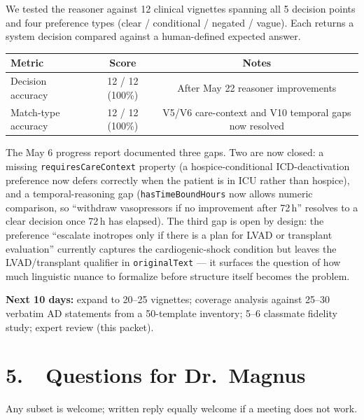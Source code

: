 \documentclass[11pt]{article}
\newcommand{\onto}[1]{\texttt{\small #1}}
\begin{document}
We tested the reasoner against 12 clinical vignettes spanning all 5 decision points and four preference types (clear / conditional / negated / vague). Each returns a system decision compared against a human-defined expected answer.

\begin{tabularx}{\textwidth}{Xcc}
\toprule
\textbf{Metric} & \textbf{Score} & \textbf{Notes} \\
\midrule
Decision accuracy   & 12 / 12 (100\%) & After May 22 reasoner improvements \\
Match-type accuracy & 12 / 12 (100\%) & V5/V6 care-context and V10 temporal gaps now resolved \\
\bottomrule
\end{tabularx}

The May 6 progress report documented three gaps. Two are now closed: a missing \onto{requiresCareContext} property (a hospice-conditional ICD-deactivation preference now defers correctly when the patient is in ICU rather than hospice), and a temporal-reasoning gap (\onto{hasTimeBoundHours} now allows numeric comparison, so ``withdraw vasopressors if no improvement after 72\,h'' resolves to a clear decision once 72\,h has elapsed). The third gap is open by design: the preference ``escalate inotropes only if there is a plan for LVAD or transplant evaluation'' currently captures the cardiogenic-shock condition but leaves the LVAD/transplant qualifier in \onto{originalText} --- it surfaces the question of how much linguistic nuance to formalize before structure itself becomes the problem.

\textbf{Next 10 days:} expand to 20--25 vignettes; coverage analysis against 25--30 verbatim AD statements from a 50-template inventory; 5--6 classmate fidelity study; expert review (this packet).

\section*{5.\ \ Questions for Dr.\ Magnus}

Any subset is welcome; written reply equally welcome if a meeting does not work.
\end{document}

